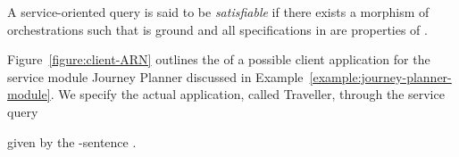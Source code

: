 \documentclass{LMCS}
\begin{document}
  \begin{defi}
    A service-oriented query  is said to be \emph{satisfiable} if there exists a morphism of orchestrations  such that  is ground and all specifications in  are properties of .
  \end{defi}

  \begin{exa}
    \label{example:traveller-application}
    Figure~\ref{figure:client-ARN} outlines the  of a possible client application for the service module Journey Planner discussed in Example~\ref{example:journey-planner-module}.  We specify the actual application, called Traveller, through the service query
    
    given by the \nb-sentence .

    \begin{figure}[h]
      \centering

      \begin{tikzpicture}



\end{tikzpicture}
\end{figure}
\end{exa}
\end{document}
